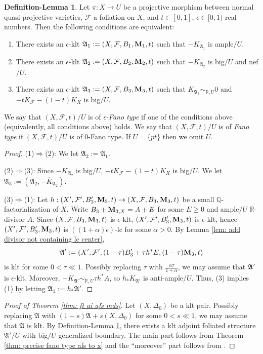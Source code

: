 \documentclass[12pt]{amsart}
\numberwithin{equation}{section}
\newcommand{\Mm}{{\bf{M}}}
\newcommand{\Rr}{\mathbb{R}}
\newcommand{\Aa}{{\mathfrak{A}}}
\newcommand{\Ff}{\mathcal{F}}
\theoremstyle{definition}
\theoremstyle{definition}
\newtheorem{deflem}[thm]{Definition-Lemma}
\theoremstyle{definition}
\begin{document}
\begin{deflem}\label{deflem: fano type afs}
    Let $\pi: X\rightarrow U$ be a projective morphism between normal quasi-projective varieties, $\Ff$ a foliation on $X$, and $t\in [0,1]$, $\epsilon\in [0,1)$ real numbers. Then the following conditions are equivalent:
    \begin{enumerate}
        \item There exists an $\epsilon$-klt $\Aa_1:=(X,\Ff,B_1,\Mm_1,t)$ such that $-K_{\Aa_1}$ is ample$/U$. 
        \item There exists an $\epsilon$-klt $\Aa_2:=(X,\Ff,B_2,\Mm_2,t)$ such that $-K_{\Aa_2}$ is big$/U$ and nef$/U$.
        \item There exists an $\epsilon$-klt $\Aa_3:=(X,\Ff,B_3,\Mm_3,t)$ such that $K_{\Aa_3}\sim_{\mathbb R,U}0$ and $-tK_{\Ff}-(1-t)K_X$ is big$/U$.
    \end{enumerate}
    We say that $(X,\Ff,t)/U$ is of \emph{$\epsilon$-Fano type} if one of the conditions above (equivalently, all conditions above) holds. We say that $(X,\Ff,t)/U$ is of \emph{Fano type} if $(X,\Ff,t)/U$ is of $0$-Fano type. If $U=\{pt\}$ then we omit $U$.
\end{deflem}
\begin{proof}
    (1)$\Rightarrow$(2): We let $\Aa_2:=\Aa_1$.
    
    (2)$\Rightarrow$(3): Since $-K_{\Aa_2}$ is big$/U$,  $-tK_{\Ff}-(1-t)K_X$ is big$/U$. We let $\Aa_3:=(\Aa_2,\overline{-K_{\Aa_2}})$.

    (3)$\Rightarrow$(1): Let $h: (X',\Ff',B_3',\Mm_3,t)\rightarrow (X,\Ff,B_3,\Mm_3,t)$ be a small $\mathbb Q$-factorialization of $X$. Write $B_3+\Mm_{3,X}=A+E$ for some $E\geq 0$ and ample$/U$ $\Rr$-divisor $A$. Since $(X,\Ff,B_3,\Mm_3,t)$ is $\epsilon$-klt, $(X',\Ff',B_3',\Mm_3,t)$ is $\epsilon$-klt, hence $(X',\Ff',B_3',\Mm_3,t)$ is $((1+\alpha)\epsilon)$-lc for some $\alpha>0$. By Lemma \ref{lem: add divisor not containing lc center},
    $$\Aa':=(X',\Ff',(1-\tau)B_3'+\tau h^*E,(1-\tau)\Mm_3,t)$$
    is klt for some $0<\tau\ll 1$. Possibly replacing $\tau$ with $\frac{\alpha\tau}{1+\alpha}$, we may assume that $\Aa'$ is $\epsilon$-klt. Moreover, $-K_{\Aa'}\sim_{\mathbb R,U}\tau h^*A$, so $h_*K_{\Aa'}$ is anti-ample$/U$. Thus, (3) implies (1) by letting $\Aa_1:=h_*\Aa'$.
\end{proof}




\begin{proof}[Proof of Theorem \ref{thm: ft ai afs mds}] 
Let $(X,\Delta_0)$ be a klt pair. Possibly replacing $\Aa$ with $(1-s)\Aa+s(X,\Delta_0)$ for some $0<s\ll 1$, we may assume that $\Aa$ is klt. By Definition-Lemma \ref{deflem: fano type afs}, there exists a klt adjoint foliated structure $\Aa'/U$ with big$/U$ generalized boundary. The main part follows from Theorem \ref{thm: precise fano type afs to x} and the ``moreover'' part follows from \cite[Corollary 1.3.1]{BCHM10}.
\end{proof}
\end{document}
